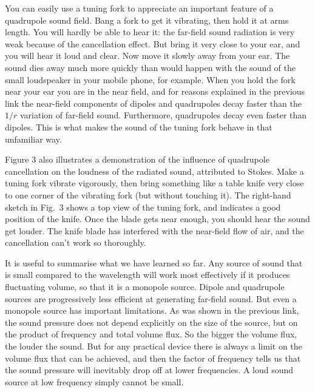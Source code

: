   You can easily use a tuning fork to appreciate an important feature of a 
  quadrupole sound field. Bang a fork to get it vibrating, then hold it at arms 
  length. You will hardly be able to hear it: the far-field sound radiation is 
  very weak because of the cancellation effect. But bring it very close to your 
  ear, and you will hear it loud and clear. Now move it slowly away from your 
  ear. The sound dies away much more quickly than would happen with the sound 
  of the small loudspeaker in your mobile phone, for example. When you hold the 
  fork near your ear you are in the near field, and for reasons explained in 
  the previous link the near-field components of dipoles and quadrupoles decay 
  faster than the $1/r$ variation of far-field sound. Furthermore, quadrupoles 
  decay even faster than dipoles. This is what makes the sound of the tuning 
  fork behave in that unfamiliar way. 

  Figure 3 also illustrates a demonstration of the influence of quadrupole 
  cancellation on the loudness of the radiated sound, attributed to Stokes. 
  Make a tuning fork vibrate vigorously, then bring something like a table 
  knife very close to one corner of the vibrating fork (but without touching 
  it). The right-hand sketch in Fig.\ 3 shows a top view of the tuning fork, 
  and indicates a good position of the knife. Once the blade gets near enough, 
  you should hear the sound get louder. The knife blade has interfered with the 
  near-field flow of air, and the cancellation can't work so thoroughly. 


  It is useful to summarise what we have learned so far. Any source of sound 
  that is small compared to the wavelength will work most effectively if it 
  produces fluctuating volume, so that it is a monopole source. Dipole and 
  quadrupole sources are progressively less efficient at generating far-field 
  sound. But even a monopole source has important limitations. As was shown in 
  the previous link, the sound pressure does not depend explicitly on the size 
  of the source, but on the product of frequency and total volume flux. So the 
  bigger the volume flux, the louder the sound. But for any practical device 
  there is always a limit on the volume flux that can be achieved, and then the 
  factor of frequency tells us that the sound pressure will inevitably drop off 
  at lower frequencies. A loud sound source at low frequency simply cannot be 
  small. 

